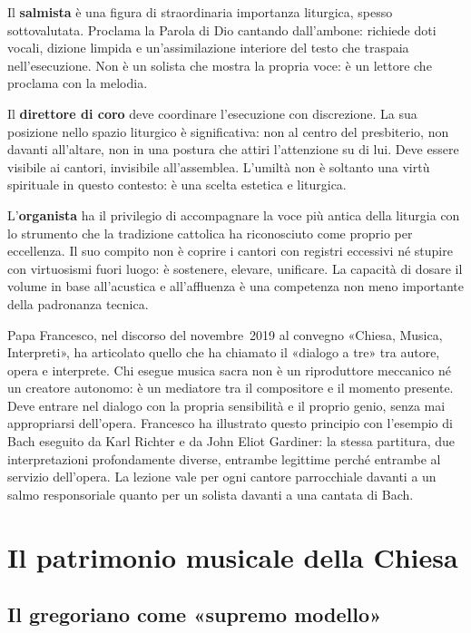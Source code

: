 \documentclass[12pt,a4paper]{article}
\begin{document}
	Il \textbf{salmista} è una figura di straordinaria importanza liturgica, spesso
	sottovalutata. Proclama la Parola di Dio cantando dall'ambone: richiede doti
	vocali, dizione limpida e un'assimilazione interiore del testo che traspaia
	nell'esecuzione. Non è un solista che mostra la propria voce: è un lettore che
	proclama con la melodia.
	
	Il \textbf{direttore di coro} deve coordinare l'esecuzione con discrezione. La
	sua posizione nello spazio liturgico è significativa: non al centro del
	presbiterio, non davanti all'altare, non in una postura che attiri l'attenzione
	su di lui. Deve essere visibile ai cantori, invisibile all'assemblea. L'umiltà
	non è soltanto una virtù spirituale in questo contesto: è una scelta estetica e
	liturgica.
	
	L'\textbf{organista} ha il privilegio di accompagnare la voce più antica della
	liturgia con lo strumento che la tradizione cattolica ha riconosciuto come proprio
	per eccellenza. Il suo compito non è coprire i cantori con registri eccessivi né
	stupire con virtuosismi fuori luogo: è sostenere, elevare, unificare. La
	capacità di dosare il volume in base all'acustica e all'affluenza è una
	competenza non meno importante della padronanza tecnica.
	
	Papa Francesco, nel discorso del novembre~2019 al convegno «Chiesa, Musica,
	Interpreti», ha articolato quello che ha chiamato il «dialogo a tre» tra autore,
	opera e interprete. Chi esegue musica sacra non è un riproduttore meccanico né
	un creatore autonomo: è un mediatore tra il compositore e il momento presente.
	Deve entrare nel dialogo con la propria sensibilità e il proprio genio, senza mai
	appropriarsi dell'opera. Francesco ha illustrato questo principio con l'esempio
	di Bach eseguito da Karl Richter e da John Eliot Gardiner: la stessa partitura,
	due interpretazioni profondamente diverse, entrambe legittime perché entrambe al
	servizio dell'opera. La lezione vale per ogni cantore parrocchiale davanti a un
	salmo responsoriale quanto per un solista davanti a una cantata di Bach.
	
	\section{Il patrimonio musicale della Chiesa}
	
	\subsection{Il gregoriano come «supremo modello»}
	
\end{document}
